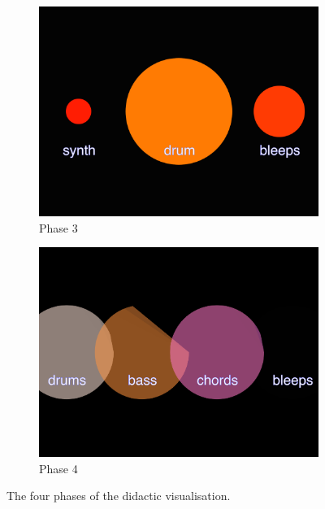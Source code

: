 \begin{figure}
\begin{subfigure}{.5\textwidth}
  \includegraphics[width=.95\linewidth]{../study-2/results/visualisations/didactic-three.png}
  \caption{Phase 3}
  \label{fig:didactic-three}
\end{subfigure}%
\begin{subfigure}{.5\textwidth}
  \centering
  \includegraphics[width=.95\linewidth]{../study-2/results/visualisations/didactic-four.png}
  \caption{Phase 4}
  \label{fig:didactic-four}
\end{subfigure}

\caption[Didactic visualisation phases]{The four phases of the didactic visualisation.}
\label{fig:didactic-visualisations}
\end{figure}
